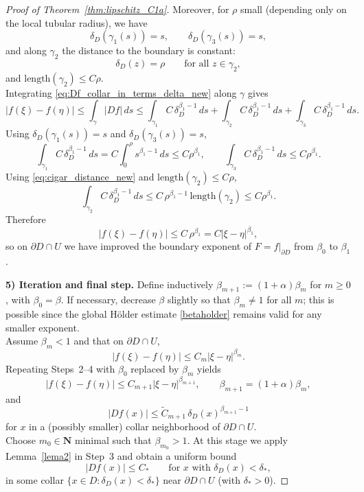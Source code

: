 \documentclass{amsart}
\begin{document}
\begin{proof}[Proof of Theorem~\ref{thm:lipschitz_C1a}]
Moreover, for $\rho$ small (depending only on the local tubular radius), we have
\[
\delta_D(\gamma_1(s))=s,\qquad \delta_D(\gamma_3(s))=s,
\]
and along $\gamma_2$ the distance to the boundary is constant:
\begin{equation}\label{eq:cigar_distance_new}
\delta_D(z)= \rho \qquad\text{for all }z\in\gamma_2,
\end{equation}
and $\mathrm{length}(\gamma_2)\le C\rho$.
\\
Integrating \eqref{eq:Df_collar_in_terms_delta_new} along $\gamma$ gives
\[
|f(\xi)-f(\eta)|
\le \int_\gamma |Df|\,ds
\le \int_{\gamma_1} C\,\delta_D^{\beta_1-1}\,ds
     +\int_{\gamma_2} C\,\delta_D^{\beta_1-1}\,ds
     +\int_{\gamma_3} C\,\delta_D^{{\beta_1}-1}\,ds.
\]
Using $\delta_D(\gamma_1(s))=s$ and $\delta_D(\gamma_3(s))=s$,
\[
\int_{\gamma_1} C\,\delta_D^{{\beta_1}-1}\,ds
= C\int_0^\rho s^{{\beta_1}-1}\,ds
\le C\rho^{\beta_1},
\qquad
\int_{\gamma_3} C\,\delta_D^{{\beta_1}-1}\,ds \le C\rho^{\beta_1}.
\]
Using \eqref{eq:cigar_distance_new} and $\mathrm{length}(\gamma_2)\le C\rho$,
\[
\int_{\gamma_2} C\,\delta_D^{{\beta_1}-1}\,ds
\le C\,\rho^{{\beta_1}-1}\,\mathrm{length}(\gamma_2)
\le C\rho^{\beta_1}.
\]
Therefore
\[
|f(\xi)-f(\eta)|\le C\,\rho^{\beta_1}=C|\xi-\eta|^{\beta_1},
\]
so on $\partial D\cap U$ we have improved the boundary exponent of $F=f|_{\partial D}$ from
$\beta_0$ to $\beta_1$.

\medskip
\noindent\textbf{5) Iteration and final step.}
Define inductively $\beta_{m+1}:=(1+\alpha)\beta_m$ for $m\ge 0$, with $\beta_0=\beta$.
If necessary, decrease $\beta$ slightly so that $\beta_m\neq 1$ for all $m$; this is possible since the
global H\"older estimate \eqref{betaholder} remains valid for any smaller exponent.
\\
Assume $\beta_m<1$ and that on $\partial D\cap U$,
\begin{equation}\label{eq:trace_holder_stage_m}
|f(\xi)-f(\eta)|\le C_m|\xi-\eta|^{\beta_m}.
\end{equation}
Repeating Steps~2--4 with $\beta_0$ replaced by $\beta_m$ yields
\[
|f(\xi)-f(\eta)|\le C_{m+1}|\xi-\eta|^{\beta_{m+1}},
\qquad \beta_{m+1}=(1+\alpha)\beta_m,
\]
and
\[
|Df(x)|\le \widetilde C_{m+1}\,\delta_D(x)^{\beta_{m+1}-1}
\]
for $x$ in a (possibly smaller) collar neighborhood of $\partial D\cap U$.
\\

Choose $m_0\in\mathbf{N}$ minimal such that $\beta_{m_0}>1$.
At this stage we apply Lemma~\ref{lema2} in Step~3 and obtain a uniform bound
\begin{equation}\label{eq:Df_bounded_collar}
|Df(x)|\le C_*\qquad\text{for }x\text{ with }\delta_D(x)<\delta_*,
\end{equation}
in some collar $\{x\in D:\delta_D(x)<\delta_*\}$ near $\partial D\cap U$ (with $\delta_*>0$).



\end{proof}
\end{document}
